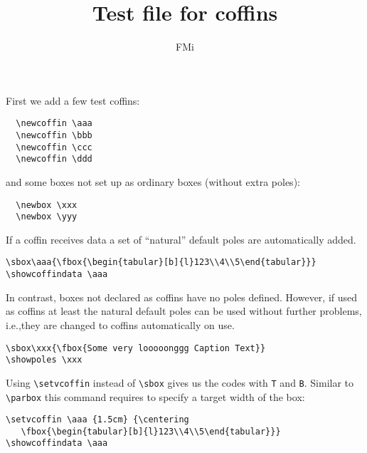\documentclass{article}
\begin{document}
\title{Test file for coffins}
\author{FMi}
\maketitle

First we add a few test coffins:
\begin{verbatim}
  \newcoffin \aaa
  \newcoffin \bbb
  \newcoffin \ccc
  \newcoffin \ddd
\end{verbatim}
  \newcoffin \aaa
  \newcoffin \bbb
  \newcoffin \ccc
  \newcoffin \ddd
and some boxes not set up as ordinary boxes (without extra poles):
\begin{verbatim}
  \newbox \xxx
  \newbox \yyy
\end{verbatim}
  \newbox \xxx
  \newbox \yyy


If a coffin receives data a set of ``natural'' default poles are automatically added.
\begin{verbatim}
\sbox\aaa{\fbox{\begin{tabular}[b]{l}123\\4\\5\end{tabular}}}
\showcoffindata \aaa
\end{verbatim}
\sbox{}
\showcoffindata \aaa


In contrast, boxes not declared as coffins have no poles defined. However, if
used as coffins at least the natural default poles can be used without
further problems, i.e.,they are changed to coffins automatically on use.
\begin{verbatim}
\sbox\xxx{\fbox{Some very looooonggg Caption Text}}
\showpoles \xxx
\end{verbatim}
\sbox{}
\showcoffindata \xxx


Using \verb|\setvcoffin| instead of \verb|\sbox| gives us the codes with
\texttt{T} and \texttt{B}. Similar to \verb|\parbox| this command requires to
specify a target width of the box:
\begin{verbatim}
\setvcoffin \aaa {1.5cm} {\centering
   \fbox{\begin{tabular}[b]{l}123\\4\\5\end{tabular}}}
\showcoffindata \aaa
\end{verbatim}
\setvcoffin \aaa {1.5cm} {\centering
   }
\showcoffindata \aaa
\end{document}
